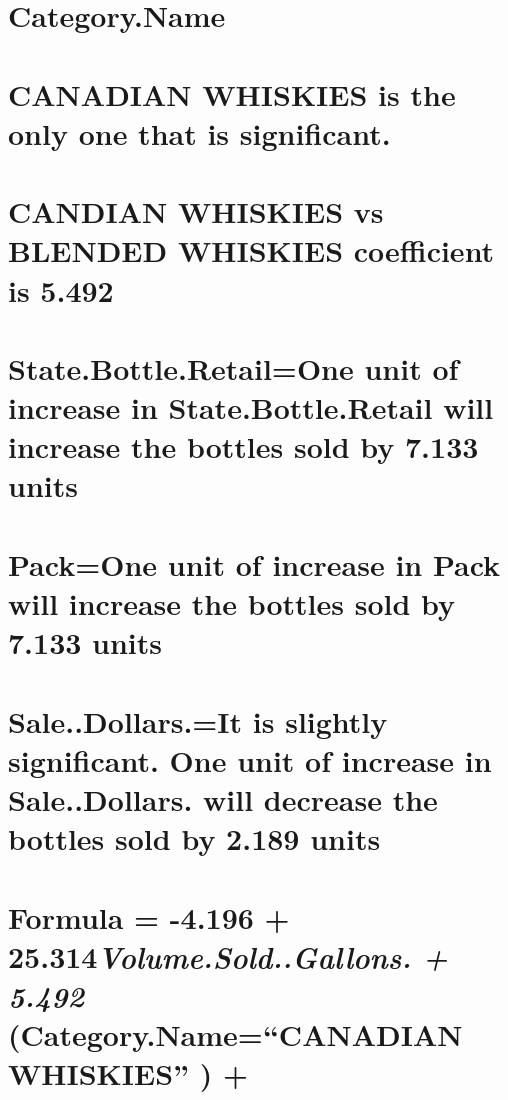 \documentclass[]{elsarticle} %
\begin{document}
\section{Category.Name}\label{category.name}

\section{CANADIAN WHISKIES is the only one that is
significant.}\label{canadian-whiskies-is-the-only-one-that-is-significant.}

\section{CANDIAN WHISKIES vs BLENDED WHISKIES coefficient is
5.492}\label{candian-whiskies-vs-blended-whiskies-coefficient-is-5.492}

\section{State.Bottle.Retail=One unit of increase in State.Bottle.Retail
will increase the bottles sold by 7.133
units}\label{state.bottle.retailone-unit-of-increase-in-state.bottle.retail-will-increase-the-bottles-sold-by-7.133-units}

\section{Pack=One unit of increase in Pack will increase the bottles
sold by 7.133
units}\label{packone-unit-of-increase-in-pack-will-increase-the-bottles-sold-by-7.133-units}

\section{Sale..Dollars.=It is slightly significant. One unit of increase
in Sale..Dollars. will decrease the bottles sold by 2.189
units}\label{sale..dollars.it-is-slightly-significant.-one-unit-of-increase-in-sale..dollars.-will-decrease-the-bottles-sold-by-2.189-units}

\section{\texorpdfstring{Formula = -4.196 +
25.314\emph{Volume.Sold..Gallons. + 5.492 } (Category.Name=``CANADIAN
WHISKIES'' )
+}{Formula = -4.196 + 25.314Volume.Sold..Gallons. + 5.492  (Category.Name=CANADIAN WHISKIES ) +}}\label{formula--4.196-25.314volume.sold..gallons.-5.492-category.namecanadian-whiskies}
\end{document}
